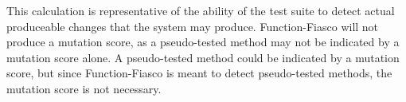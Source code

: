 This calculation is representative of the ability of the test suite to detect actual produceable changes that the system may produce\cite{friedman_voas_1995}. Function-Fiasco will not produce a mutation score, as a pseudo-tested method may not be indicated by a mutation score alone. A pseudo-tested method could be indicated by a mutation score, but since Function-Fiasco is meant to detect pseudo-tested methods, the mutation score is not necessary.

